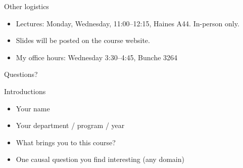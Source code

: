 \documentclass[xcolor=dvipsnames]{beamer}
\begin{document}
\begin{frame}{Other logistics}
\small
\begin{itemize}
\item Lectures: Monday, Wednesday, 11:00--12:15, Haines A44. In-person only. \medskip
\item Slides will be posted on the course website.\medskip
\item My office hours: Wednesday 3:30--4:45, Bunche 3264  \medskip
\end{itemize}
\end{frame}

\begin{frame}{}
\begin{center}
\Large Questions?
\end{center}
\end{frame}

\begin{frame}{Introductions}
\begin{itemize}
\item Your name
\item Your department / program / year
\item What brings you to this course?
\item One causal question you find interesting (any domain)
\end{itemize}
\end{frame}
\end{document}
